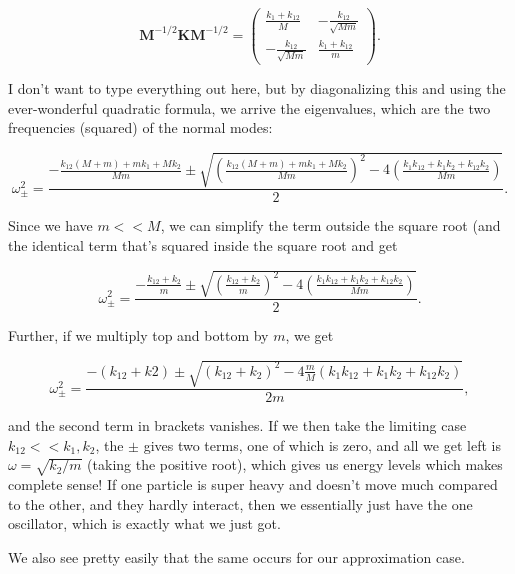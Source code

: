 \begin{equation}
  \mathbf{M}^{-1/2}\mathbf{K}\mathbf{M}^{-1/2} = \begin{pmatrix}\frac{k_1 + k_{12}}{M} & - \frac{k_{12}}{\sqrt{Mm}} \\ - \frac{k_{12}}{\sqrt{Mm}} & \frac{k_1 + k_{12}}{m}\end{pmatrix}.
\end{equation}

I don't want to type everything out here, but by diagonalizing this and using the ever-wonderful quadratic formula, we arrive the eigenvalues, which are the two frequencies (squared) of the normal modes:

\begin{equation}
  \omega^2_\pm = \frac{-\frac{k_{12}(M + m) + mk_1 + Mk_2}{Mm} \pm \sqrt{\left( \frac{k_{12}(M + m) + mk_1 + Mk_2}{Mm} \right)^2 - 4\left( \frac{k_1k_{12} + k_1k_2 + k_{12}k_2}{Mm} \right)}}{2}.
\end{equation}

Since we have $m << M$, we can simplify the term outside the square root (and the identical term that's squared inside the square root and get

\begin{equation}
  \omega^2_\pm = \frac{- \frac{k_{12} + k_2}{m} \pm \sqrt{\left( \frac{k_{12} + k_2}{m} \right)^2 - 4\left( \frac{k_1k_{12} + k_1k_2 + k_{12}k_2}{Mm} \right)}}{2}.
\end{equation}

Further, if we multiply top and bottom by $m$, we get

\begin{equation}
  \omega^2_\pm = \frac{-(k_{12} + k2) \pm \sqrt{(k_{12} + k_2)^2 - 4 \frac{m}{M}(k_1k_{12} + k_1k_2 + k_{12}k_2)}}{2m},
\end{equation}

and the second term in brackets vanishes. If we then take the limiting case $k_{12} << k_1,k_2$, the $\pm$ gives two terms, one of which is zero, and all we get left is $\omega = \sqrt{k_2/m}$ (taking the positive root), which gives us energy levels which makes complete sense! If one particle is super heavy and doesn't move much compared to the other, and they hardly interact, then we essentially just have the one oscillator, which is exactly what we just got.

We also see pretty easily that the same occurs for our approximation case.




